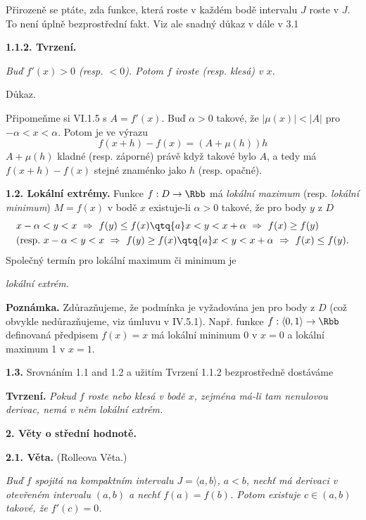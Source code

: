 \documentclass[12pt]{article}
\begin{document}
{Přirozeně se ptáte, zda funkce, která roste v každém bodě intervalu $J$ roste v $J$. To není úplně bezprostřední fakt. Viz ale snadný důkaz v d\'ale v 3.1


\medskip

{\bf 1.1.2. Tvrzení.} {\em Buď $f'(x)>0$ (resp. $<0$). Potom $f$ iroste (resp. klesá) v $x$.

Důkaz.} Připomeňme si VI.1.5 s $A=f'(x)$. Buď $\alpha>0$ takové, že $|\mu(x)|<|A|$ pro $-\alpha < x<\alpha$. Potom je ve výrazu
$$
f(x+h)-f(x)=(A+\mu(h))h
$$
 $A+\mu(h)$ kladné (resp. záporné) právě když takové bylo $A$, a tedy má $f(x+h)-f(x)$ stejné znaménko jako $h$ (resp. opačné).\sq  

\bigskip

{\bf 1.2. Lokální extrémy.} Funkce $f:D\to \Rbb$ má 
 {\em lokální maximum} (resp. {\em lokální minimum}) $M=f(x)$ v bodě $x$ existuje-li $\alpha>0$ takové, že pro body $y$ z $D$
 $$
 \begin{aligned}
 &x-\alpha <y<x\  \Rightarrow\  f(y)\leq f(x)\qtq{a}
 x<y<x+\alpha\  \Rightarrow\  f(x)\geq f(y)\\
 &(\text{resp.}\ x-\alpha <y<x\  \Rightarrow\  f(y)\geq f(x)\qtq{a}
 x<y<x+\alpha\  \Rightarrow\  f(x)\leq f(y). 
 \end{aligned}
 $$
 Společný termín pro lokální maximum či minimum je
 
 \smallskip
 
 \centerline{\em lokální extrém.}
 
 \medskip
 
 {\bf Poznámka.} Zdůrazňujeme, že podmínka je vyžadována jen pro body z $D$  (což obvykle nedůrazňujeme, viz úmluvu v  IV.5.1). Např. funkce $f:\langle 0,1\rangle\to\Rbb$ definovaná předpisem $f(x)=x$ má lokální minimum 0 v $x=0$ a  lokální maximum 1 v $x=1$.
 
 \bigskip
 
 {\bf 1.3.} Srovnáním  1.1 and 1.2 a užitím Tvrzení 1.1.2
 bezprostředně dostáváme
 
 \medskip
 
 {\bf Tvrzení.} {\em Pokud $f$ roste nebo klesá v bodě $x$, zejména má-li tam nenulovou derivac, nemá v něm lokální extrém. }

 
 
 \vskip10mm
 
 {\large\bf 2. Věty o střední hodnotě.}
 
 \bigskip
 
 {\bf 2.1. Věta.} (Rolleova Věta.) {\em Buď $f$ spojitá na kompaktním intervalu $J=\langle a,b\rangle$, $a<b$,   nechť má derivaci v otevřeném intervalu
  $(a,b)$ a nechť $f(a)=f(b)$. Potom existuje $c\in (a,b)$ takové, že
  $f'(c)=0$.
  
}}
\end{document}

